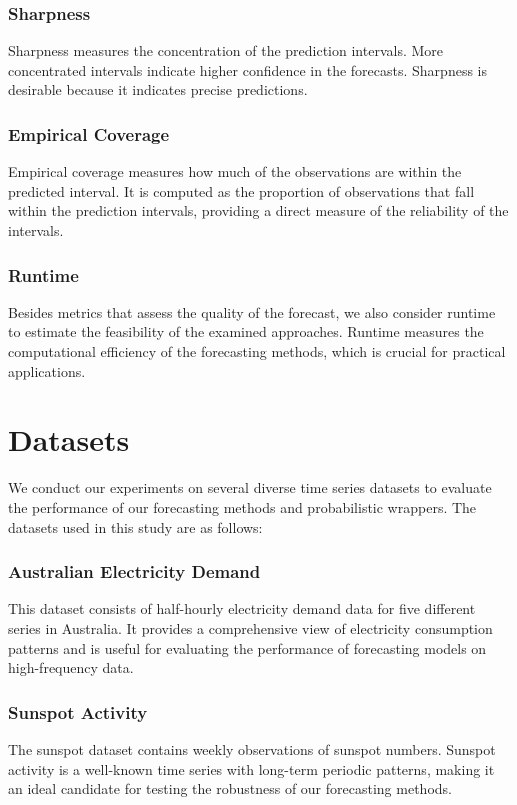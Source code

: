 \subsubsection{Sharpness}
Sharpness measures the concentration of the prediction intervals. More concentrated intervals indicate higher confidence in the forecasts. Sharpness is desirable because it indicates precise predictions.

\subsubsection{Empirical Coverage}
Empirical coverage measures how much of the observations are within the predicted interval. It is computed as the proportion of observations that fall within the prediction intervals, providing a direct measure of the reliability of the intervals.

\subsubsection{Runtime}
Besides metrics that assess the quality of the forecast, we also consider runtime to estimate the feasibility of the examined approaches. Runtime measures the computational efficiency of the forecasting methods, which is crucial for practical applications.

\section{Datasets} \label{datasets}
We conduct our experiments on several diverse time series datasets to evaluate the performance of our forecasting methods and probabilistic wrappers. The datasets used in this study are as follows:

\subsubsection{Australian Electricity Demand}
This dataset consists of half-hourly electricity demand data for five different series in Australia. It provides a comprehensive view of electricity consumption patterns and is useful for evaluating the performance of forecasting models on high-frequency data.

\subsubsection{Sunspot Activity}
The sunspot dataset contains weekly observations of sunspot numbers. Sunspot activity is a well-known time series with long-term periodic patterns, making it an ideal candidate for testing the robustness of our forecasting methods.

